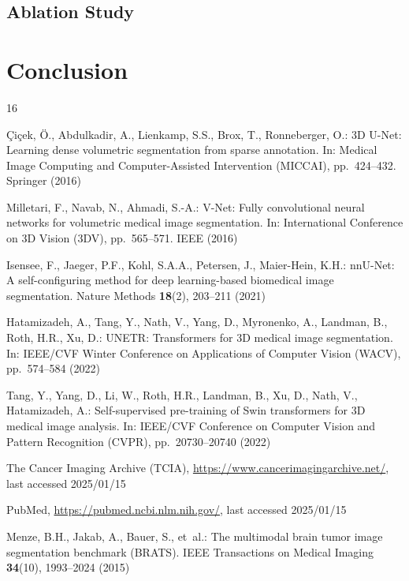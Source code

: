 \documentclass[runningheads]{llncs}
\begin{document}
\subsection{Ablation Study}\label{sec:ablation}


\section{Conclusion}\label{sec:conclusion}


%
%
\begin{thebibliography}{16}

{\c{C}}i{\c{c}}ek, {\"O}., Abdulkadir, A., Lienkamp, S.S., Brox, T.,
Ronneberger, O.:
3D U-Net: Learning dense volumetric segmentation from sparse annotation.
In: Medical Image Computing and Computer-Assisted Intervention (MICCAI),
pp.~424--432. Springer (2016)

Milletari, F., Navab, N., Ahmadi, S.-A.:
V-Net: Fully convolutional neural networks for volumetric medical image
segmentation.
In: International Conference on 3D Vision (3DV), pp.~565--571. IEEE (2016)

Isensee, F., Jaeger, P.F., Kohl, S.A.A., Petersen, J., Maier-Hein, K.H.:
nnU-Net: A self-configuring method for deep learning-based biomedical image
segmentation.
Nature Methods \textbf{18}(2), 203--211 (2021)

Hatamizadeh, A., Tang, Y., Nath, V., Yang, D., Myronenko, A., Landman, B.,
Roth, H.R., Xu, D.:
UNETR: Transformers for 3D medical image segmentation.
In: IEEE/CVF Winter Conference on Applications of Computer Vision (WACV),
pp.~574--584 (2022)

Tang, Y., Yang, D., Li, W., Roth, H.R., Landman, B., Xu, D.,
Nath, V., Hatamizadeh, A.:
Self-supervised pre-training of Swin transformers for 3D medical image
analysis.
In: IEEE/CVF Conference on Computer Vision and Pattern Recognition (CVPR),
pp.~20730--20740 (2022)

The Cancer Imaging Archive (TCIA),
\url{https://www.cancerimagingarchive.net/}, last accessed 2025/01/15

PubMed, \url{https://pubmed.ncbi.nlm.nih.gov/}, last accessed 2025/01/15

Menze, B.H., Jakab, A., Bauer, S., et~al.:
The multimodal brain tumor image segmentation benchmark ({BRATS}).
IEEE Transactions on Medical Imaging \textbf{34}(10), 1993--2024 (2015)


\end{thebibliography}
\end{document}
